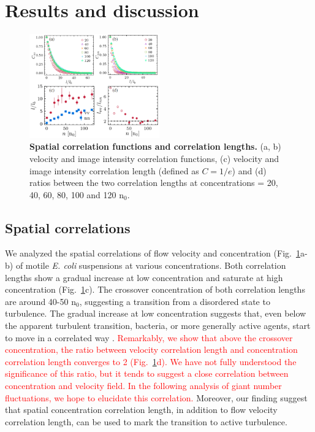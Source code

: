 \documentclass[twocolumn,aps,pre,amsmath,amssymb,longbibliography]{revtex4-1}
\begin{document}
\section{Results and discussion}





\begin{figure}[h]
\begin{center}
\includegraphics[width=0.5\textwidth]{GNF_figure-2-v2.PNG}
\caption[]{\textbf{Spatial correlation functions and correlation lengths.} (a, b) velocity and image intensity correlation functions, (c) velocity and image intensity correlation length (defined as $C=1/e$) and (d) ratios between the two correlation lengths at concentrations = 20, 40, 60, 80, 100 and 120 n$_0$.}
\label{fig:2}
\end{center}
\end{figure}

\subsection{Spatial correlations}
We analyzed the spatial correlations of flow velocity and concentration (Fig.~\ref{fig:2}a-b) of motile \textit{E. coli} suspensions at various concentrations. Both correlation lengths show a gradual increase at low concentration and saturate at high concentration (Fig.~\ref{fig:2}c). The crossover concentration of both correlation lengths are around 40-50 n$_0$, suggesting a transition from a disordered state to turbulence. The gradual increase at low concentration suggests that, even below the apparent turbulent transition, bacteria, or more generally active agents, start to move in a correlated way \cite{PhysRevLett.119.028005}. \textcolor{red}{Remarkably, we show that above the crossover concentration, the ratio between velocity correlation length and concentration correlation length converges to 2 (Fig.~\ref{fig:2}d). We have not fully understood the significance of this ratio, but it tends to suggest a close correlation between concentration and velocity field. In the following analysis of giant number fluctuations, we hope to elucidate this correlation.} Moreover, our finding suggest that spatial concentration correlation length, in addition to flow velocity correlation length\cite{Wensink14308, PhysRevLett.110.228102}, can be used to mark the transition to active turbulence.
\end{document}
